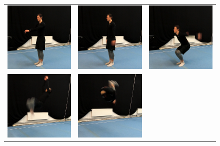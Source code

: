 \begin{figure}
   \centering
\begin{tabular}{ccc}
\includegraphics[width=5cm]{images/data-preprocessing/unrec-backflip-part-1}&
\includegraphics[width=5cm]{images/data-preprocessing/unrec-backflip-part-2}&
\includegraphics[width=5cm]{images/data-preprocessing/unrec-backflip-part-3}\\
\includegraphics[width=5cm]{images/data-preprocessing/unrec-backflip-part-4}&
\includegraphics[width=5cm]{images/data-preprocessing/unrec-backflip-part-5}&

\end{tabular}
\end{figure}
